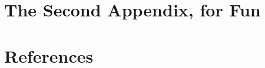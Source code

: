 \documentclass[12pt,twoside]{reedthesis}
\begin{document}
\hypertarget{the-second-appendix-for-fun}{%
\chapter{The Second Appendix, for Fun}\label{the-second-appendix-for-fun}}

\backmatter

\hypertarget{references}{%
\chapter*{References}\label{references}}


\noindent

\setlength{\parindent}{-0.20in}
\end{document}
